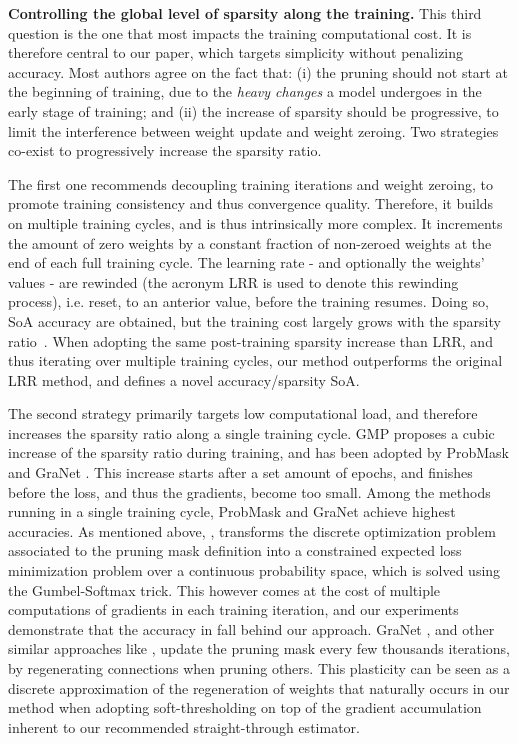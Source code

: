 \documentclass[10pt,twocolumn,letterpaper]{article}
\begin{document}
{\bf Controlling the global level of sparsity along the training.} This third question is the one that most impacts the training computational cost. It is therefore central to our paper, which targets simplicity without penalizing accuracy. 
Most authors \cite{Frankle2020,Frankle2020b,Renda2020,Leclerc2020} agree on the fact that: (i) the pruning should not start at the beginning of training, due to the \emph{heavy changes} a model undergoes in the early stage of training; and (ii) the increase of sparsity should be progressive, to limit the interference between weight update and weight zeroing. Two strategies co-exist to progressively increase the sparsity ratio.

The first one recommends decoupling training iterations and weight zeroing, to promote training consistency and thus convergence quality. Therefore, it builds on multiple training cycles, and is thus intrinsically more complex.
It increments the amount of zero weights by a constant fraction of non-zeroed weights at the end of each full training cycle. The learning rate - and optionally the weights' values - are rewinded (the acronym LRR is used to denote this rewinding process), i.e. reset, to an anterior value, before the training resumes. Doing so, SoA accuracy are obtained, but the training cost largely grows with the sparsity ratio~\cite{Frankle2020,Renda2020}. When adopting the same post-training sparsity increase than LRR, and thus iterating over multiple training cycles, our method outperforms the original LRR method, and defines a novel accuracy/sparsity SoA.


The second strategy primarily targets low computational load, and therefore increases the sparsity ratio along a single training cycle. GMP \cite{Zhu2018} proposes a cubic increase of the sparsity ratio during training, and has been adopted by ProbMask \cite{Zhou2021} and GraNet \cite{Liu2021}. This increase starts after a set amount of epochs, and finishes before the loss, and thus the gradients, become too small. Among the methods running in a single training cycle, ProbMask \cite{Zhou2021} and GraNet \cite{Liu2021} achieve highest accuracies. As mentioned above, \cite{Zhou2021}, transforms the discrete optimization problem associated to the pruning mask definition into a constrained expected loss minimization problem over a continuous probability space, which is solved using the Gumbel-Softmax trick. This however comes at the cost of multiple computations of gradients in each training iteration, and our experiments demonstrate that the accuracy in \cite{Zhou2021} fall behind our approach.
GraNet \cite{Liu2021}, and other similar approaches like \cite{Evci2020,liu2021we}, update the pruning mask every few thousands iterations, by regenerating connections when pruning others. This plasticity can be seen as a discrete approximation of the regeneration of weights that naturally occurs in our method when adopting soft-thresholding on top of the gradient accumulation inherent to our recommended straight-through estimator.
\end{document}
